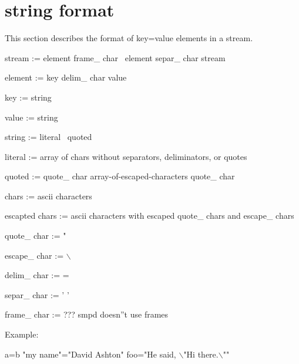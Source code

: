 \documentclass{article}
\begin{document}
\section{string format}
This section describes the format of key=value elements in a stream.

stream := element frame\_ char \vline\ element separ\_ char stream

element := key delim\_ char value

key := string

value := string

string := literal \vline\ quoted

literal := array of chars without separators, deliminators, or quotes

quoted := quote\_ char array-of-escaped-characters quote\_ char

chars := ascii characters

escapted chars := ascii characters with escaped quote\_ chars and escape\_ chars

quote\_ char := "

escape\_ char := $\backslash$

delim\_ char := =

separ\_ char := ' '

frame\_ char := ??? smpd doesn''t use frames

Example:

	a=b "my name"="David Ashton" foo="He said, $\backslash$"Hi there.$\backslash$""
	
\end{document}
